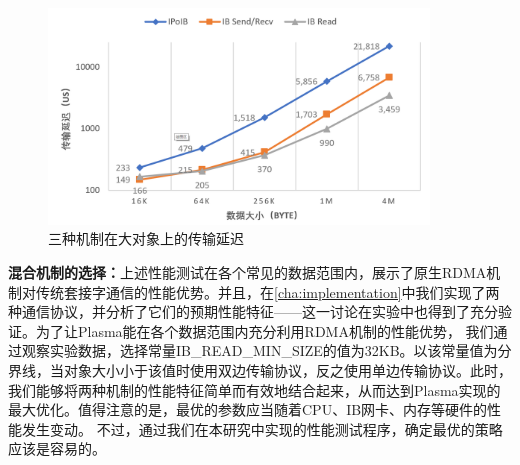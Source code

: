 \begin{figure}[h]
	\centering
	\includegraphics[width=0.9\textwidth]{image/chap04/big.png}
	\caption{三种机制在大对象上的传输延迟}
	\label{fig:big}
\end{figure}

\textbf{混合机制的选择：}上述性能测试在各个常见的数据范围内，展示了原生RDMA机制对传统套接字通信的性能优势。并且，在\autoref{cha:implementation}中我们实现了两种通信协议，并分析了它们的预期性能特征——这一讨论在实验中也得到了充分验证。为了让Plasma能在各个数据范围内充分利用RDMA机制的性能优势，
我们通过观察实验数据，选择常量IB\_READ\_MIN\_SIZE的值为32KB。以该常量值为分界线，当对象大小小于该值时使用双边传输协议，反之使用单边传输协议。此时，我们能够将两种机制的性能特征简单而有效地结合起来，从而达到Plasma实现的最大优化。值得注意的是，最优的参数应当随着CPU、IB网卡、内存等硬件的性能发生变动。
不过，通过我们在本研究中实现的性能测试程序，确定最优的策略应该是容易的。